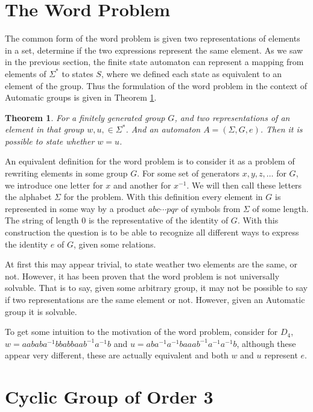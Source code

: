 \documentclass[10pt]{amsart}
\newtheorem{itheorem}{Theorem}
\theoremstyle{definition}
\theoremstyle{remark}
\newenvironment{theorem}{\begin{center}\begin{minipage}{0.9\textwidth}\begin{itheorem}}{\end{itheorem}\end{minipage}\end{center}}
\begin{document}
\section{The Word Problem}\label{sec:the_word_problem}

The common form of the word problem is given two representations of elements in
a set, determine if the two expressions represent the same element. As we saw
in the previous section, the finite state automaton can represent a mapping
from elements of $\Sigma^*$ to states $S$, where we defined each state as
equivalent to an element of the group. Thus the formulation of the word problem
in the context of Automatic groups is given in Theorem \ref{thm:twp}.

\begin{theorem}\label{thm:twp}
  For a finitely generated group $G$, and two representations of an element in
  that group $w,u,\in\Sigma^*$. And an automaton $A=\left(\Sigma,G,e\right)$.
  Then it is possible to state whether $w=u$.
\end{theorem}

An equivalent definition for the word problem is to consider it as a problem of
rewriting elements in some group $G$. For some set of generators $x, y,
z,\ldots$ for $G$, we introduce one letter for $x$ and another for $x^{-1}$. We
will then call these letters the alphabet $\Sigma$ for the problem. With this
definition every element in $G$ is represented in some way by a product
$abc\cdots pqr$ of symbols from $\Sigma$ of some length. The string of length
$0$ is the representative of the identity of $G$. With this construction the
question is to be able to recognize all different ways to express the identity
$e$ of $G$, given some relations.

At first this may appear trivial, to state weather two elements are the same,
or not. However, it has been proven that the word problem is not universally
solvable. That is to say, given some arbitrary group, it may not be possible to
say if two representations are the same element or not. However, given an
Automatic group it is solvable.

To get some intuition to the motivation of the word problem, consider for
$D_4$, $w=aababa^{-1}bbabbaab^{-1}a^{-1}b$ and
$u=aba^{-1}a^{-1}baaab^{-1}a^{-1}a^{-1}b$, although these appear very
different, these are actually equivalent and both $w$ and $u$ represent $e$.

\section{Cyclic Group of Order 3}%
\label{sec:cyclic_group_of_order_3}
\end{document}
